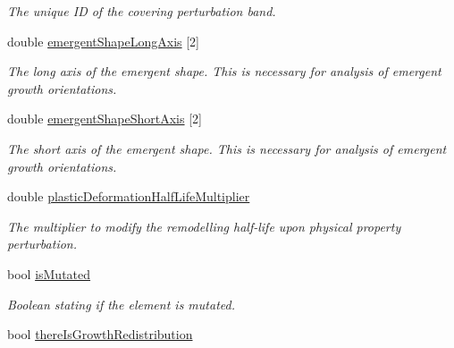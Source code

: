 \begin{DoxyCompactItemize}
\begin{DoxyCompactList}\small\item\em The unique I\+D of the covering perturbation band. \end{DoxyCompactList}\item 
\hypertarget{classShapeBase_a1484f5942bbd147ce0e9e1d842919103}{}double \hyperlink{classShapeBase_a1484f5942bbd147ce0e9e1d842919103}{emergent\+Shape\+Long\+Axis} \mbox{[}2\mbox{]}\label{classShapeBase_a1484f5942bbd147ce0e9e1d842919103}

\begin{DoxyCompactList}\small\item\em The long axis of the emergent shape. This is necessary for analysis of emergent growth orientations. \end{DoxyCompactList}\item 
\hypertarget{classShapeBase_a60c845ab5c6b7e8083faa1a9833765f7}{}double \hyperlink{classShapeBase_a60c845ab5c6b7e8083faa1a9833765f7}{emergent\+Shape\+Short\+Axis} \mbox{[}2\mbox{]}\label{classShapeBase_a60c845ab5c6b7e8083faa1a9833765f7}

\begin{DoxyCompactList}\small\item\em The short axis of the emergent shape. This is necessary for analysis of emergent growth orientations. \end{DoxyCompactList}\item 
\hypertarget{classShapeBase_a30219b72a2e37fad6ad5dfbcb371a85e}{}double \hyperlink{classShapeBase_a30219b72a2e37fad6ad5dfbcb371a85e}{plastic\+Deformation\+Half\+Life\+Multiplier}\label{classShapeBase_a30219b72a2e37fad6ad5dfbcb371a85e}

\begin{DoxyCompactList}\small\item\em The multiplier to modify the remodelling half-\/life upon physical property perturbation. \end{DoxyCompactList}\item 
\hypertarget{classShapeBase_a3633ac9356d82c0259770ace63ca3d3d}{}bool \hyperlink{classShapeBase_a3633ac9356d82c0259770ace63ca3d3d}{is\+Mutated}\label{classShapeBase_a3633ac9356d82c0259770ace63ca3d3d}

\begin{DoxyCompactList}\small\item\em Boolean stating if the element is mutated. \end{DoxyCompactList}\item 
\hypertarget{classShapeBase_afb4ab7a9dcb19f182cde416757397b7c}{}bool \hyperlink{classShapeBase_afb4ab7a9dcb19f182cde416757397b7c}{there\+Is\+Growth\+Redistribution}\label{classShapeBase_afb4ab7a9dcb19f182cde416757397b7c}


\end{DoxyCompactItemize}

